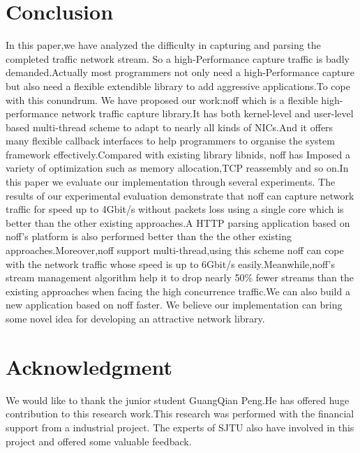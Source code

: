 \documentclass[conference]{IEEEtran}
\begin{document}
\section{Conclusion}
In this paper,we have analyzed the difficulty in capturing and parsing the completed traffic network stream. So a high-Performance capture traffic is badly demanded.Actually 
most programmers not only need a high-Performance capture but also need a flexible extendible library to add aggressive applications.To cope with this conundrum. We have proposed our work:noff which is a flexible high-performance network traffic capture library.It has both kernel-level and user-level based multi-thread scheme to adapt to nearly all kinds of NICs.And it offers many flexible callback interfaces to help programmers to organise the system framework effectively.Compared with existing library libnids, noff has Imposed a variety of optimization such as memory allocation,TCP reassembly and so on.In this paper we evaluate our implementation through several experiments.
\newline\indent The results of our experimental evaluation demonstrate that noff can  capture network traffic for speed up to 4Gbit/s without packets loss using a single core which is better than the other existing approaches.A HTTP parsing application based on noff's platform is also performed better than the the other existing approaches.Moreover,noff support multi-thread,using this scheme noff can cope with the network traffic whose speed is up to 6Gbit/s easily.Meanwhile,noff's stream management algorithm help it to drop nearly 50\% fewer streams than the existing approaches when facing the high concurrence traffic.We can also build a new application based on noff faster.
\newline\indent We believe our implementation can bring some novel idea for developing an
attractive network library. 





\section*{Acknowledgment}

We would like to thank the junior student GuangQian Peng.He has offered huge contribution to this research work.This research was performed with the financial support from a industrial project. The experts of SJTU also have involved in this project and offered some valuable feedback.
\end{document}
